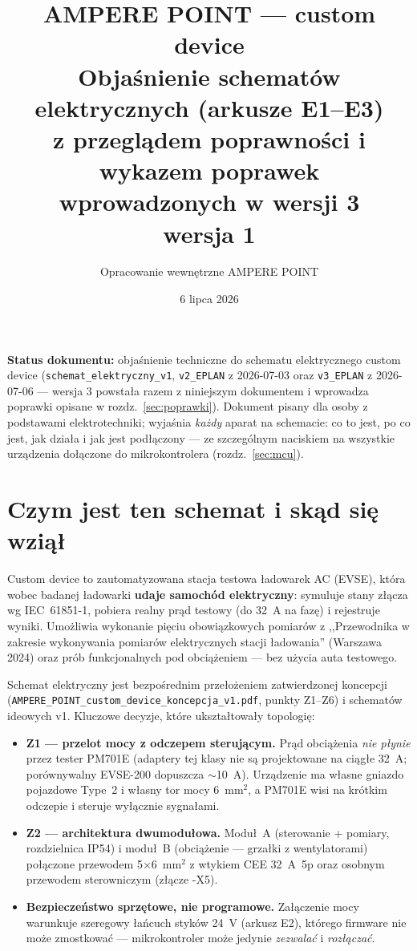 \documentclass[11pt,a4paper]{article}
\title{\textbf{\color{granat}AMPERE POINT --- custom device}\\[4pt]
\large Objaśnienie schematów elektrycznych (arkusze E1--E3)\\
z przeglądem poprawności i wykazem poprawek wprowadzonych w wersji 3\\[2pt]
\normalsize wersja 1}
\author{Opracowanie wewnętrzne AMPERE POINT}
\date{6 lipca 2026}
\begin{document}
\maketitle
\vspace{-1.6em}

\noindent\textbf{Status dokumentu:} objaśnienie techniczne do schematu elektrycznego custom device
(\texttt{schemat\_elektryczny\_v1}, \texttt{v2\_EPLAN} z 2026-07-03 oraz \texttt{v3\_EPLAN} z 2026-07-06
--- wersja 3 powstała razem z niniejszym dokumentem i wprowadza poprawki opisane w rozdz.~\ref{sec:poprawki}).
Dokument pisany dla osoby z podstawami elektrotechniki; wyjaśnia \emph{każdy} aparat na schemacie:
co to jest, po co jest, jak działa i jak jest podłączony --- ze szczególnym naciskiem na wszystkie
urządzenia dołączone do mikrokontrolera (rozdz.~\ref{sec:mcu}).

\tableofcontents

\section{Czym jest ten schemat i skąd się wziął}
\label{sec:wstep}

Custom device to zautomatyzowana stacja testowa ładowarek AC (EVSE), która wobec badanej ładowarki
\textbf{udaje samochód elektryczny}: symuluje stany złącza wg IEC~61851-1, pobiera realny prąd
testowy (do 32~A na fazę) i rejestruje wyniki. Umożliwia wykonanie pięciu obowiązkowych pomiarów
z ,,Przewodnika w zakresie wykonywania pomiarów elektrycznych stacji ładowania'' (Warszawa 2024)
oraz prób funkcjonalnych pod obciążeniem --- bez użycia auta testowego.

Schemat elektryczny jest bezpośrednim przełożeniem zatwierdzonej koncepcji
(\texttt{AMPERE\_POINT\_custom\_device\_koncepcja\_v1.pdf}, punkty Z1--Z6) i schematów ideowych v1.
Kluczowe decyzje, które ukształtowały topologię:

\begin{itemize}
\item \textbf{Z1 --- przelot mocy z odczepem sterującym.} Prąd obciążenia \emph{nie płynie} przez
tester PM701E (adaptery tej klasy nie są projektowane na ciągłe 32~A; porównywalny EVSE-200
dopuszcza $\sim$10~A). Urządzenie ma własne gniazdo pojazdowe Type~2 i własny tor mocy 6~mm$^2$,
a PM701E wisi na krótkim odczepie i steruje wyłącznie sygnałami.
\item \textbf{Z2 --- architektura dwumodułowa.} Moduł~A (sterowanie + pomiary, rozdzielnica IP54)
i moduł~B (obciążenie --- grzałki z wentylatorami) połączone przewodem 5$\times$6~mm$^2$ z wtykiem
CEE 32~A~5p oraz osobnym przewodem sterowniczym (złącze -X5).
\item \textbf{Bezpieczeństwo sprzętowe, nie programowe.} Załączenie mocy warunkuje szeregowy
łańcuch styków 24~V (arkusz E2), którego firmware nie może zmostkować --- mikrokontroler może
jedynie \emph{zezwalać} i \emph{rozłączać}.
\end{itemize}
\end{document}
